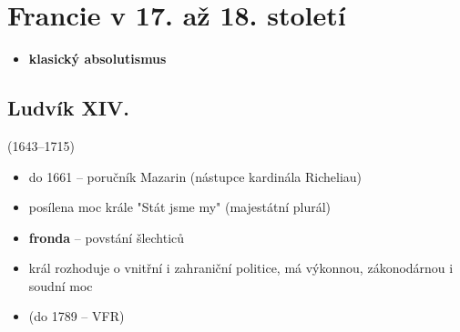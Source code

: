 \section{Francie v 17. až 18. století}
\begin{itemize}
\item \textbf{klasický absolutismus}
\end{itemize}
\subsection{Ludvík XIV.}(1643--1715)
\begin{itemize}
\item do 1661 -- poručník Mazarin (nástupce kardinála Richeliau)
\item posílena moc krále \ra "Stát jsme my" (majestátní plurál)
\item \textbf{fronda} -- povstání šlechticů
\item král rozhoduje o vnitřní i zahraniční politice, má výkonnou, zákonodárnou i soudní moc
\item {}(do 1789 -- VFR)
\end{itemize}

